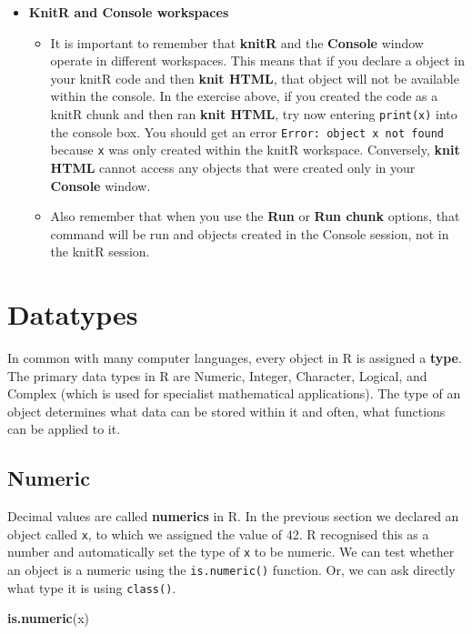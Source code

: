 \documentclass[a4paper]{book}
\newenvironment{Shaded}{\begin{snugshade}}{\end{snugshade}}
\newcommand{\KeywordTok}[1]{\textcolor[rgb]{0.13,0.29,0.53}{\textbf{{#1}}}}
\newcommand{\NormalTok}[1]{{#1}}
\providecommand{\tightlist}{%
  \setlength{\itemsep}{0pt}\setlength{\parskip}{0pt}}
\renewenvironment{Shaded}
{\vspace{1.5em}\begin{leftbar}\begin{snugshade}}
{\end{snugshade}\end{leftbar}\vspace{3pt}}
\newenvironment{rmdblock}[1]
  {\vspace{1.5em}\begin{shaded*}
  \begin{itemize}
  \renewcommand{\labelitemi}{
    \raisebox{-.7\height}[0pt][0pt]{
      {\setkeys{Gin}{width=3em,keepaspectratio}\texttt{[image: images/\#1]}}
    }
  }
  \item
  }
  {
  \end{itemize}
  \end{shaded*}
  }
\newenvironment{rmdtip}
  {\begin{rmdblock}{tip}}
  {\end{rmdblock}}
\begin{document}
\begin{rmdtip}
\textbf{KnitR and Console workspaces}

\begin{itemize}
\tightlist
\item
  It is important to remember that \textbf{knitR} and the
  \textbf{Console} window operate in different workspaces. This means
  that if you declare a object in your knitR code and then \textbf{knit
  HTML}, that object will not be available within the console. In the
  exercise above, if you created the code as a knitR chunk and then ran
  \textbf{knit HTML}, try now entering \texttt{print(x)} into the
  console box. You should get an error
  \texttt{Error:\ object\ x\ not\ found} because \texttt{x} was only
  created within the knitR workspace. Conversely, \textbf{knit HTML}
  cannot access any objects that were created only in your
  \textbf{Console} window.
\item
  Also remember that when you use the \textbf{Run} or \textbf{Run chunk}
  options, that command will be run and objects created in the Console
  session, not in the knitR session.
\end{itemize}
\end{rmdtip}

\section{Datatypes}\label{datatypes}

In common with many computer languages, every object in R is assigned a
\textbf{type}. The primary data types in R are Numeric, Integer,
Character, Logical, and Complex (which is used for specialist
mathematical applications). The type of an object determines what data
can be stored within it and often, what functions can be applied to it.

\subsection{Numeric}\label{numeric}

Decimal values are called \textbf{numerics} in R. In the previous
section we declared an object called \texttt{x}, to which we assigned
the value of 42. R recognised this as a number and automatically set the
type of \texttt{x} to be numeric. We can test whether an object is a
numeric using the \texttt{is.numeric()} function. Or, we can ask
directly what type it is using \texttt{class()}.

\begin{Shaded}
\begin{Highlighting}[]
\KeywordTok{is.numeric}\NormalTok{(x)}
\end{Highlighting}
\end{Shaded}
\end{document}
